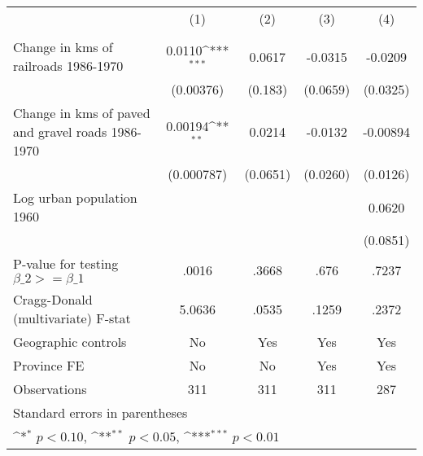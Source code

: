 {
\def\sym#1{\ifmmode^{#1}\else\(^{#1}\)\fi}
\begin{tabular}{l*{4}{c}}
\hline\hline
                &\multicolumn{1}{c}{(1)}&\multicolumn{1}{c}{(2)}&\multicolumn{1}{c}{(3)}&\multicolumn{1}{c}{(4)}\\
                &\multicolumn{1}{c}{}&\multicolumn{1}{c}{}&\multicolumn{1}{c}{}&\multicolumn{1}{c}{}\\
\hline
Change in kms of railroads 1986-1970&   0.0110\sym{***}&   0.0617         &  -0.0315         &  -0.0209         \\
                &(0.00376)         &  (0.183)         & (0.0659)         & (0.0325)         \\
[1em]
Change in kms of paved and gravel roads 1986-1970&  0.00194\sym{**} &   0.0214         &  -0.0132         & -0.00894         \\
                &(0.000787)         & (0.0651)         & (0.0260)         & (0.0126)         \\
[1em]
Log urban population 1960&                  &                  &                  &   0.0620         \\
                &                  &                  &                  & (0.0851)         \\
\hline
P-value for testing $\beta\_{2} >= \beta\_{1}$&    .0016         &    .3668         &     .676         &    .7237         \\
Cragg-Donald (multivariate) F-stat&   5.0636         &    .0535         &    .1259         &    .2372         \\
Geographic controls&       No         &      Yes         &      Yes         &      Yes         \\
Province FE     &       No         &       No         &      Yes         &      Yes         \\
Observations    &      311         &      311         &      311         &      287         \\
\hline\hline
\multicolumn{5}{l}{\footnotesize Standard errors in parentheses}\\
\multicolumn{5}{l}{\footnotesize \sym{*} \(p<0.10\), \sym{**} \(p<0.05\), \sym{***} \(p<0.01\)}\\
\end{tabular}
}
